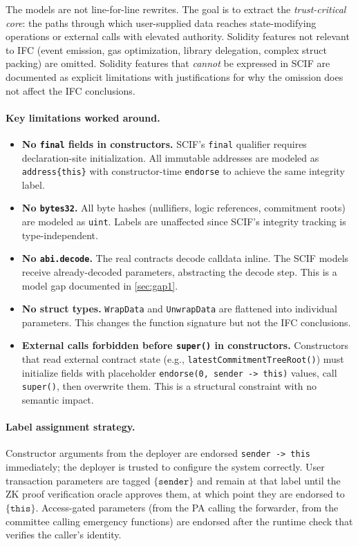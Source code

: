\documentclass[11pt,a4paper]{article}
\begin{document}
The models are not line-for-line rewrites. The goal is to extract the
\emph{trust-critical core}: the paths through which user-supplied data reaches
state-modifying operations or external calls with elevated authority. Solidity
features not relevant to IFC (event emission, gas optimization, library
delegation, complex struct packing) are omitted. Solidity features that
\emph{cannot} be expressed in SCIF are documented as explicit limitations with
justifications for why the omission does not affect the IFC conclusions.

\paragraph{Key limitations worked around.}
\begin{itemize}
  \item \textbf{No \texttt{final} fields in constructors.} SCIF's
    \texttt{final} qualifier requires declaration-site initialization.
    All immutable addresses are modeled as \texttt{address\{this\}} with
    constructor-time \texttt{endorse} to achieve the same integrity label.
  \item \textbf{No \texttt{bytes32}.} All byte hashes (nullifiers, logic
    references, commitment roots) are modeled as \texttt{uint}. Labels are
    unaffected since SCIF's integrity tracking is type-independent.
  \item \textbf{No \texttt{abi.decode}.} The real contracts decode calldata
    inline. The SCIF models receive already-decoded parameters, abstracting the
    decode step. This is a model gap documented in \cref{sec:gap1}.
  \item \textbf{No struct types.} \texttt{WrapData} and \texttt{UnwrapData} are
    flattened into individual parameters. This changes the function signature
    but not the IFC conclusions.
  \item \textbf{External calls forbidden before \texttt{super()} in
    constructors.} Constructors that read external contract state (e.g.,
    \texttt{latestCommitmentTreeRoot()}) must initialize fields with placeholder
    \texttt{endorse(0, sender -> this)} values, call \texttt{super()}, then
    overwrite them. This is a structural constraint with no semantic impact.
\end{itemize}

\paragraph{Label assignment strategy.} Constructor arguments from the deployer
are endorsed \texttt{sender -> this} immediately; the deployer is trusted to
configure the system correctly. User transaction parameters are tagged
$\{\texttt{sender}\}$ and remain at that label until the ZK proof verification
oracle approves them, at which point they are endorsed to
$\{\texttt{this}\}$. Access-gated parameters (from the PA calling the
forwarder, from the committee calling emergency functions) are endorsed after
the runtime check that verifies the caller's identity.
\end{document}

